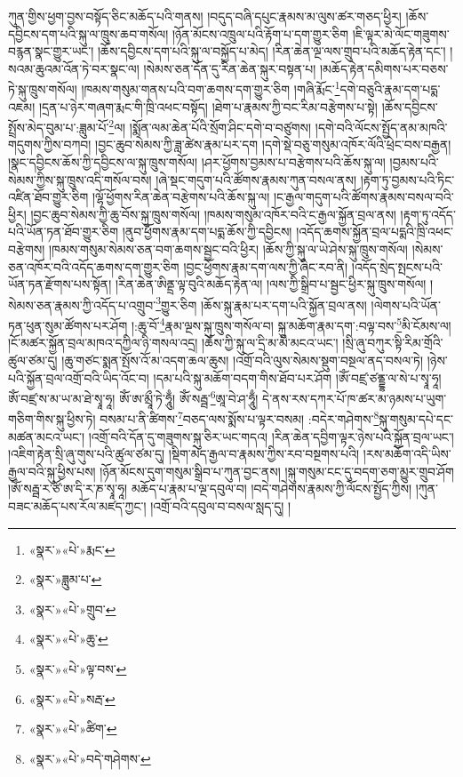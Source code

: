 ཀུན་གྱིས་ཕྱག་བྱས་བསྟོད་ཅིང་མཆོད་པའི་གནས། །བདུད་བཞི་དཔུང་རྣམས་མ་ལུས་ཚར་གཅད་ཕྱིར། །ཆོས་དབྱིངས་དག་པའི་སྐུ་ལ་ཁྲུས་ཆབ་གསོལ། །ཉོན་མོངས་འཁྲུལ་པའི་རྟོག་པ་དག་གྱུར་ཅིག །ཇི་ལྟར་མེ་ལོང་གཟུགས་བརྙན་སྣང་གྱུར་ཡང་། །ཆོས་དབྱིངས་དག་པའི་སྐུ་ལ་བསྐྱོད་པ་མེད། །རིན་ཆེན་ལྔ་ལས་གྲུབ་པའི་མཆོད་རྟེན་དང་། །སའམ་ཆུའམ་འོན་ཏེ་བར་སྣང་ལ། །སེམས་ཅན་དོན་དུ་རིན་ཆེན་སྐུར་བསྟན་པ། །མཆོད་རྟེན་དམིགས་པར་བཅས་ཏེ་སྐུ་ཁྲུས་གསོལ། །ཁམས་གསུམ་གནས་པའི་བག་ཆགས་དག་གྱུར་ཅིག །གཞི་རྨོང་\footnote{«སྣར་»«པེ་»རྨང་}དགེ་བཅུའི་རྣམ་དག་པདྨ་འཇམ། །དྲན་པ་ཉེར་གཞག་རྨང་གི་ཁྲི་འཕང་བསྟོད། །ཐེག་པ་རྣམས་ཀྱི་བང་རིམ་བརྩེགས་པ་སྟེ། །ཆོས་དབྱིངས་སྤྲོས་མེད་བུམ་པ་:ཟླུམ་པོ་\footnote{«སྣར་»ཟླུམ་པ་}ལ། །སྨོན་ལམ་ཆེན་པོའི་སྲོག་ཤིང་དགེ་བ་བཙུགས། །དགེ་བའི་ལོངས་སྤྱོད་ནམ་མཁའི་གདུགས་ཀྱིས་བཀབ། །བྱང་ཆུབ་སེམས་ཀྱི་ཟླ་ཚེས་རྣམ་པར་དག །དགེ་སྡེ་བཅུ་གསུམ་འཁོར་ལོའི་ཕྲེང་བས་བརྒྱན། །སྣང་དབྱིངས་ཆོས་ཀྱི་དབྱིངས་ལ་སྐུ་ཁྲུས་གསོལ། །ཤར་ཕྱོགས་བྱམས་པ་བརྩེགས་པའི་ཆོས་སྐུ་ལ། །བྱམས་པའི་སེམས་ཀྱིས་སྐུ་ཁྲུས་འདི་གསོལ་བས། །ཞེ་སྡང་གདུག་པའི་ཚོགས་རྣམས་ཀུན་བསལ་ནས། །རྟག་ཏུ་བྱམས་པའི་ཏིང་འཛིན་ཐོབ་གྱུར་ཅིག །ལྷོ་ཕྱོགས་རིན་ཆེན་བརྩེགས་པའི་ཆོས་སྐུ་ལ། །ང་རྒྱལ་གདུག་པའི་ཚོགས་རྣམས་བསལ་བའི་ཕྱིར། །བྱང་ཆུབ་སེམས་ཀྱི་ཆུ་བོས་སྐུ་ཁྲུས་གསོལ། །ཁམས་གསུམ་འཁོར་བའི་ང་རྒྱལ་སྐྱོན་བྲལ་ནས། །རྟག་ཏུ་འདོད་པའི་ཡོན་ཏན་ཐོབ་གྱུར་ཅིག །ནུབ་ཕྱོགས་རྣམ་དག་པདྨ་ཆོས་ཀྱི་དབྱིངས། །འདོད་ཆགས་སྐྱོན་བྲལ་པདྨའི་ཁྲི་འཕང་བརྩེགས། །ཁམས་གསུམ་སེམས་ཅན་བག་ཆགས་སྦྱང་བའི་ཕྱིར། །ཆོས་ཀྱི་སྐུ་ལ་ཡེ་ཤེས་སྐུ་ཁྲུས་གསོལ། །སེམས་ཅན་འཁོར་བའི་འདོད་ཆགས་དག་གྱུར་ཅིག །བྱང་ཕྱོགས་རྣམ་དག་ལས་ཀྱི་ཞིང་རབ་ནི། །འདོད་སྲེད་སྤངས་པའི་ཡོན་ཏན་རྫོགས་པས་སྟོན། །རིན་ཆེན་ཨིནྡྲ་ལྟ་བུའི་མཆོད་རྟེན་ལ། །ལས་ཀྱི་སྒྲིབ་པ་སྦྱང་ཕྱིར་སྐུ་ཁྲུས་གསོལ། །སེམས་ཅན་རྣམས་ཀྱི་འདོད་པ་འགྲུབ་\footnote{«སྣར་»«པེ་»གྲུབ་}གྱུར་ཅིག །ཆོས་སྐུ་རྣམ་པར་དག་པའི་སྐྱོན་བྲལ་ནས། །ལེགས་པའི་ཡོན་ཏན་ཕུན་སུམ་ཚོགས་པར་ཤོག །:ཆུ་བོ་\footnote{«སྣར་»«པེ་»ཆུ་}རྣམ་ལྔས་སྐུ་ཁྲུས་གསོལ་བ། སྐུ་མཆོག་རྣམ་དག་:བལྟ་བས་\footnote{«སྣར་»«པེ་»ལྟ་བས་}མི་ངོམས་ལ། །ངོ་མཚར་སྐྱོན་བྲལ་མཁའ་དཀྱིལ་ཉི་གསལ་འདྲ། །ཆོས་ཀྱི་སྐུ་ལ་དྲི་མ་མི་མངའ་ཡང་། །སྲི་ཞུ་བཀུར་སྟི་རིམ་གྲོའི་ཚུལ་ཙམ་དུ། །ཆུ་གཙང་སྨན་སྤོས་འོ་མ་འདག་ཆལ་ཆུས། །འགྲོ་བའི་ལུས་སེམས་སྡུག་བསྔལ་ནད་བསལ་ཏེ། །ཉེས་པའི་སྐྱོན་བྲལ་འགྲོ་བའི་ཡིད་འོང་བ། །དམ་པའི་སྐུ་མཆོག་བདག་གིས་ཐོབ་པར་ཤོག །ཨོཾ་བཛྲ་ཙནྡྷ་ལ་སེ་པ་སྭཱ་ཧཱ། ཨོཾ་བཛྲ་ས་མ་ཡ་མ་ཐེ་སྭཱ་ཧཱ། ཨོཾ་ཨ་མྲཱྀ་ཏེ་ཧཱུྃ། ཨོཾ་སརྦྦ་\footnote{«སྣར་»«པེ་»སརྦ་}ཨཱ་བེ་ཤ་ཧཱུྃ། དེ་ནས་རས་དཀར་པོ་ཁ་ཚར་མ་ཉམས་པ་ཡུག་གཅིག་གིས་སྐུ་ཕྱིས་ཏེ། བསམ་པ་ནི་ཚིགས་\footnote{«སྣར་»«པེ་»ཚིག་}བཅད་ལས་སྨོས་པ་ལྟར་བསམ། :བདེར་གཤེགས་\footnote{«སྣར་»«པེ་»བདེ་གཤེགས་}སྐུ་གསུམ་དཔེ་དང་མཚན་མངའ་ཡང་། །འགྲོ་བའི་དོན་དུ་གཟུགས་སྐུ་ཅིར་ཡང་གདའ། །རིན་ཆེན་དབྱིག་ལྟར་ཉེས་པའི་སྐྱོན་བྲལ་ཡང་། །འཇིག་རྟེན་སྲི་ཞུ་གུས་པའི་ཚུལ་ཙམ་དུ། །སྡིག་མེད་རྒྱལ་བ་རྣམས་ཀྱིས་རབ་བསྔགས་པའི། །རས་མཆོག་འདི་ཡིས་རྒྱལ་བའི་སྐུ་ཕྱིས་པས། །ཉོན་མོངས་དུག་གསུམ་སྒྲིབ་པ་ཀུན་བྱང་ནས། །སྐུ་གསུམ་ངང་དུ་བདག་ཅག་མྱུར་གྲུབ་ཤོག །ཨོཾ་སརྦྦ་ར་ཙོ་ཨ་དི་ར་ཎ་སྭཱ་ཧཱ། མཆོད་པ་རྣམ་པ་ལྔ་དབུལ་བ། །བདེ་གཤེགས་རྣམས་ཀྱི་ལོངས་སྤྱོད་ཀྱིས། །ཀུན་བཟང་མཆོད་པས་རོལ་མཛད་ཀྱང་། །འགྲོ་བའི་དབུལ་བ་བསལ་སླད་དུ། །
